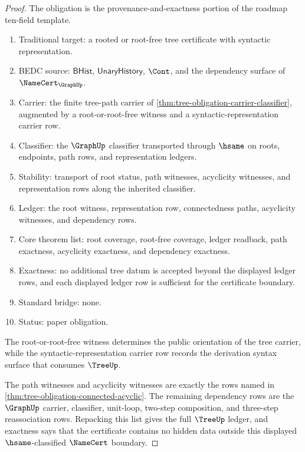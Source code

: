 \begin{proof}
The obligation is the provenance-and-exactness portion of the roadmap
ten-field template.
\begin{enumerate}
  \item Traditional target: a rooted or root-free tree certificate with
  syntactic representation.
  \item BEDC source: $\mathsf{BHist}$, $\mathsf{UnaryHistory}$, $\Cont$, and
  the dependency surface of $\NameCert_{\GraphUp}$.
  \item Carrier: the finite tree-path carrier of
  \autoref{thm:tree-obligation-carrier-classifier}, augmented by a
  root-or-root-free witness and a syntactic-representation carrier row.
  \item Classifier: the $\GraphUp$ classifier transported through $\hsame$ on
  roots, endpoints, path rows, and representation ledgers.
  \item Stability: transport of root status, path witnesses, acyclicity
  witnesses, and representation rows along the inherited classifier.
  \item Ledger: the root witness, representation row, connectedness paths,
  acyclicity witnesses, and dependency rows.
  \item Core theorem list: root coverage, root-free coverage, ledger
  readback, path exactness, acyclicity exactness, and dependency exactness.
  \item Exactness: no additional tree datum is accepted beyond the displayed
  ledger rows, and each displayed ledger row is sufficient for the certificate
  boundary.
  \item Standard bridge: none.
  \item Status: paper obligation.
\end{enumerate}

The root-or-root-free witness determines the public orientation of the tree
carrier, while the syntactic-representation carrier row records the derivation
syntax surface that consumes $\TreeUp$.

The path witnesses and acyclicity witnesses are exactly the rows named in
\autoref{thm:tree-obligation-connected-acyclic}. The remaining dependency
rows are the $\GraphUp$ carrier, classifier, unit-loop, two-step composition,
and three-step reassociation rows. Repacking this list gives the full
$\TreeUp$ ledger, and exactness says that the certificate contains no hidden
data outside this displayed $\hsame$-classified $\NameCert$ boundary.
\end{proof}

